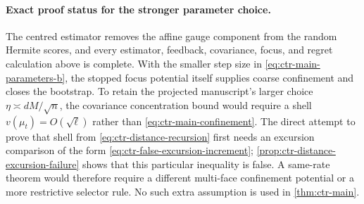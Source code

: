 \paragraph{Exact proof status for the stronger parameter choice.}
The centred estimator removes the affine gauge component from the random
Hermite scores, and every estimator, feedback, covariance, focus, and regret
calculation above is complete.  With the smaller step size in
\eqref{eq:ctr-main-parameters-b}, the stopped focus potential itself supplies
coarse confinement and closes the bootstrap.  To retain the projected
manuscript's larger choice $\eta\asymp dM/\sqrt n$, the covariance
concentration bound would require a shell $v(\mu_t)=O(\sqrt\ell)$ rather than
\eqref{eq:ctr-main-confinement}.  The direct attempt to prove that shell from
\eqref{eq:ctr-distance-recursion} first needs an excursion comparison of the
form \eqref{eq:ctr-false-excursion-increment};
\cref{prop:ctr-distance-excursion-failure} shows that this particular
inequality is false.  A same-rate theorem would therefore require a different
multi-face confinement potential or a more restrictive selector rule.  No
such extra assumption is used in \cref{thm:ctr-main}.
